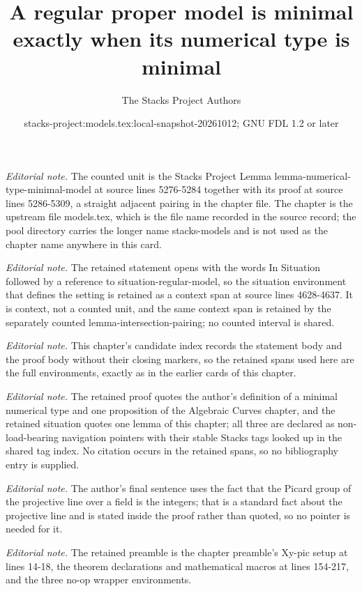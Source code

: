 \documentclass[10pt,a4paper]{amsart}
\title{A regular proper model is minimal exactly when its numerical type is minimal}
\author{The Stacks Project Authors}
\date{stacks-project:models.tex:local-snapshot-20261012; GNU FDL 1.2 or later}
\theoremstyle{plain}
\theoremstyle{definition}
\theoremstyle{remark}
\numberwithin{equation}{subsection}
\begin{document}
\maketitle
\noindent\textit{Editorial note.} The counted unit is the Stacks Project Lemma lemma-numerical-type-minimal-model at source lines 5276-5284 together with its proof at source lines 5286-5309, a straight adjacent pairing in the chapter file. The chapter is the upstream file models.tex, which is the file name recorded in the source record; the pool directory carries the longer name stacks-models and is not used as the chapter name anywhere in this card.\par\medskip
\noindent\textit{Editorial note.} The retained statement opens with the words In Situation followed by a reference to situation-regular-model, so the situation environment that defines the setting is retained as a context span at source lines 4628-4637. It is context, not a counted unit, and the same context span is retained by the separately counted lemma-intersection-pairing; no counted interval is shared.\par\medskip
\noindent\textit{Editorial note.} This chapter's candidate index records the statement body and the proof body without their closing markers, so the retained spans used here are the full environments, exactly as in the earlier cards of this chapter.\par\medskip
\noindent\textit{Editorial note.} The retained proof quotes the author's definition of a minimal numerical type and one proposition of the Algebraic Curves chapter, and the retained situation quotes one lemma of this chapter; all three are declared as non-load-bearing navigation pointers with their stable Stacks tags looked up in the shared tag index. No citation occurs in the retained spans, so no bibliography entry is supplied.\par\medskip
\noindent\textit{Editorial note.} The author's final sentence uses the fact that the Picard group of the projective line over a field is the integers; that is a standard fact about the projective line and is stated inside the proof rather than quoted, so no pointer is needed for it.\par\medskip
\noindent\textit{Editorial note.} The retained preamble is the chapter preamble's Xy-pic setup at lines 14-18, the theorem declarations and mathematical macros at lines 154-217, and the three no-op wrapper environments.\par\medskip
\end{document}
